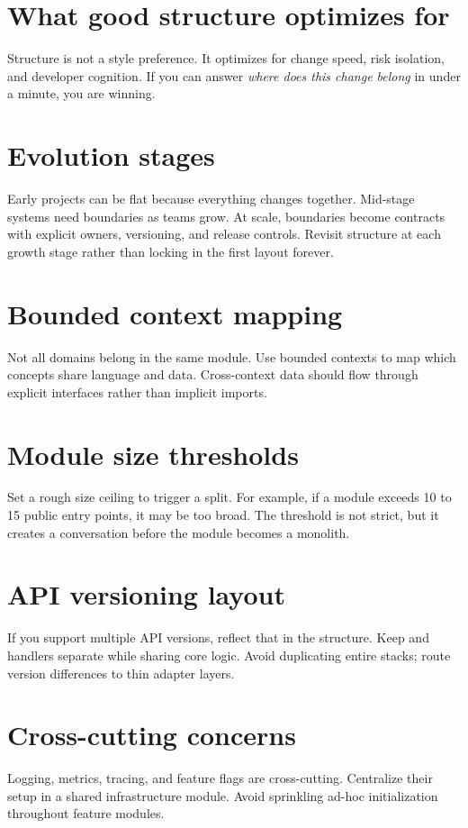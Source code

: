 \section{What good structure optimizes for}
Structure is not a style preference.
It optimizes for change speed, risk isolation, and developer cognition.
If you can answer \emph{where does this change belong} in under a minute, you are winning.

\section{Evolution stages}
Early projects can be flat because everything changes together.
Mid-stage systems need boundaries as teams grow.
At scale, boundaries become contracts with explicit owners, versioning, and release controls.
Revisit structure at each growth stage rather than locking in the first layout forever.

\section{Bounded context mapping}
Not all domains belong in the same module.
Use bounded contexts to map which concepts share language and data.
Cross-context data should flow through explicit interfaces rather than implicit imports.

\section{Module size thresholds}
Set a rough size ceiling to trigger a split.
For example, if a module exceeds 10 to 15 public entry points, it may be too broad.
The threshold is not strict, but it creates a conversation before the module becomes a monolith.

\section{API versioning layout}
If you support multiple API versions, reflect that in the structure.
Keep  and  handlers separate while sharing core logic.
Avoid duplicating entire stacks; route version differences to thin adapter layers.

\section{Cross-cutting concerns}
Logging, metrics, tracing, and feature flags are cross-cutting.
Centralize their setup in a shared infrastructure module.
Avoid sprinkling ad-hoc initialization throughout feature modules.

